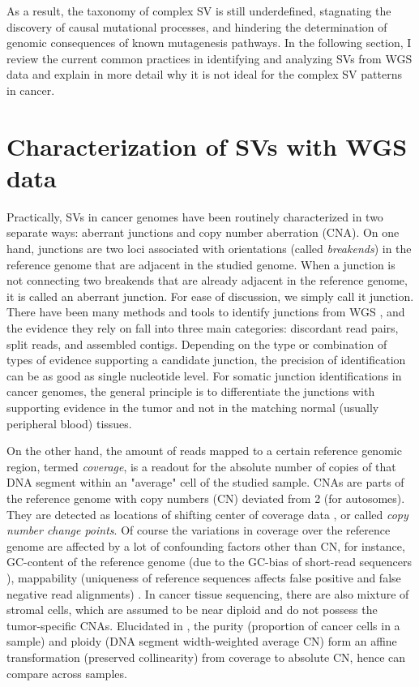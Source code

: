 \documentclass[phd,tocprelim]{cornell}
\begin{document}
As a result, the taxonomy of complex SV is still underdefined, stagnating the discovery of causal mutational processes, and hindering the determination of genomic consequences of known mutagenesis pathways. In the following section, I review the current common practices in identifying and analyzing SVs from WGS data and explain in more detail why it is not ideal for the complex SV patterns in cancer.

\section{Characterization of SVs with WGS data}
Practically, SVs in cancer genomes have been routinely characterized in two separate ways: aberrant junctions and copy number aberration (CNA). On one hand, junctions are two loci associated with orientations (called \textit{breakends}) in the reference genome that are adjacent in the studied genome. When a junction is not connecting two breakends that are already adjacent in the reference genome, it is called an aberrant junction. For ease of discussion, we simply call it junction. There have been many methods and tools to identify junctions from WGS \cite{wala2018,Cameron2017-pz,Rausch2012-ly,Wang2011-lg,Layer2014-xq}, and the evidence they rely on fall into three main categories: discordant read pairs, split reads, and assembled contigs. Depending on the type or combination of types of evidence supporting a candidate junction, the precision of identification can be as good as single nucleotide level. For somatic junction identifications in cancer genomes, the general principle is to differentiate the junctions with supporting evidence in the tumor and not in the matching normal (usually peripheral blood) tissues.

On the other hand, the amount of reads mapped to a certain reference genomic region, termed \textit{coverage}, is a readout for the absolute number of copies of that DNA segment within an "average" cell of the studied sample. CNAs are parts of the reference genome with copy numbers (CN) deviated from 2 (for autosomes). They are detected as locations of shifting center of coverage data \cite{Ha2014-ai,Xi2011-oa,Carter2012-xo,Favero2015-hj,Van_Loo2010-ed,Shen2016-fi}, or called \textit{copy number change points}. Of course the variations in coverage over the reference genome are affected by a lot of confounding factors other than CN, for instance, GC-content of the reference genome (due to the GC-bias of short-read sequencers \cite{Benjamini_Speed_2012}), mappability (uniqueness of reference sequences affects false positive and false negative read alignments) \cite{Lee_Schatz_2012}. In cancer tissue sequencing, there are also mixture of stromal cells, which are assumed to be near diploid and do not possess the tumor-specific CNAs. Elucidated in \cite{Carter2012-xo}, the purity (proportion of cancer cells in a sample) and ploidy (DNA segment width-weighted average CN) form an affine transformation (preserved collinearity) from coverage to absolute CN, hence can compare across samples.
\end{document}
